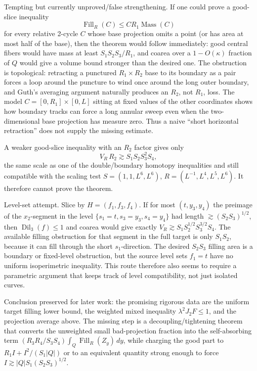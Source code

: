 \documentclass[12pt]{article}
\newcommand{\Dil}{\operatorname{Dil}}
\newcommand{\Fill}{\operatorname{Fill}}
\newcommand{\Mass}{\operatorname{Mass}}
\begin{document}
Tempting but currently unproved/false strengthening.  If one could prove a
good-slice inequality
\[
 \Fill_R(C)\le C R_1\Mass(C)
\]
for every relative 2-cycle \(C\) whose base projection omits a point (or has
area at most half of the base), then the theorem would follow immediately:
good central fibers would have mass at least \(S_1S_2S_3/R_1\), and coarea over
a \(1-O(\kappa)\) fraction of \(Q\) would give a volume bound stronger than the
desired one.  The obstruction is topological: retracting a punctured
\(R_1\times R_2\) base to its boundary as a pair forces a loop around the
puncture to wind once around the long outer boundary, and Guth's averaging
argument naturally produces an \(R_2\), not \(R_1\), loss.  The model
\(C=[0,R_1]\times[0,L]\) sitting at fixed values of the other coordinates shows
how boundary tracks can force a long annular sweep even when the two-dimensional
base projection has measure zero.  Thus a naive ``short horizontal retraction''
does not supply the missing estimate.

A weaker good-slice inequality with an \(R_2\) factor gives only
\[
 V_R\,R_2\gtrsim S_1S_2S_3^2S_4,
\]
the same scale as one of the double/boundary homotopy inequalities and still
compatible with the scaling test \(S=(1,1,L^6,L^6)\),
\(R=(L^{-1},L^4,L^5,L^6)\).  It therefore cannot prove the theorem.

Level-set attempt.  Slice by \(H=(f_1,f_3,f_4)\).  If for most
\((t,y_3,y_4)\) the preimage of the \(x_2\)-segment in the level
\(\{s_1=t,s_3=y_3,s_4=y_4\}\) had length \(\gtrsim (S_2S_3)^{1/2}\), then
\(\Dil_3(f)\le1\) and coarea would give exactly
\(V_R\gtrsim S_1S_2^{1/2}S_3^{3/2}S_4\).  The available filling obstruction for
that segment in the full target is only \(S_1S_2\), because it can fill through
the short \(s_1\)-direction.  The desired \(S_2S_3\) filling area is a boundary
or fixed-level obstruction, but the source level sets \(f_1=t\) have no uniform
isoperimetric inequality.  This route therefore also seems to require a
parametric argument that keeps track of level compatibility, not just isolated
curves.

Conclusion preserved for later work: the promising rigorous data are the
uniform target filling lower bound, the weighted mixed inequality
\(\lambda^2J_2F\le1\), and the projection average above.  The missing step is a
decoupling/tightening theorem that converts the unweighted small bad-projection
fraction into the self-absorbing term
\((R_3R_4/S_3S_4)\int_Q\Fill_R(Z_y)\,dy\), while charging the good part to
\(R_1I+I^2/(S_1|Q|)\) or to an equivalent quantity strong enough to force
\(I\gtrsim |Q|S_1(S_2S_3)^{1/2}\).
\end{document}
